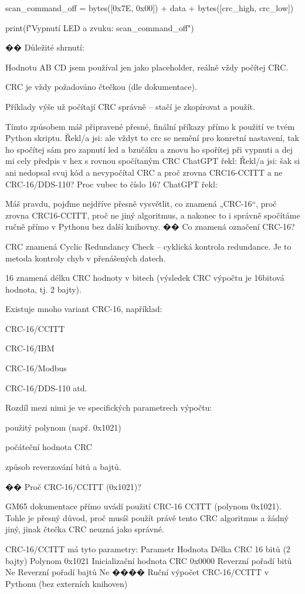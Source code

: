 scan_command_off = bytes([0x7E, 0x00]) + data + bytes([crc_high, crc_low])

print(f"Vypnutí LED a zvuku: {scan_command_off}")

�� Důležité shrnutí:

    Hodnotu AB CD jsem používal jen jako placeholder, reálně vždy počítej CRC.

    CRC je vždy požadováno čtečkou (dle dokumentace).

    Příklady výše už počítají CRC správně – stačí je zkopírovat a použít.

Tímto způsobem máš připravené přesné, finální příkazy přímo k použití ve tvém Python skriptu.
Řekl/a jsi:
ale vždyt to crc se nemění pro konretní nastavení, tak ho spočítej sám pro zapnutí led a bzučáku a znovu ho spořítej při vypnuti a dej mi cely předpis v hex s rovnou spočítaným CRC
ChatGPT řekl:
Řekl/a jsi:
šak si ani nedopsal svuj kód a nevypočítal CRC a proč zrovna CRC16-CCITT a ne CRC-16/DDS-110? Proc vubec to číslo 16?
ChatGPT řekl:

Máš pravdu, pojďme nejdříve přesně vysvětlit, co znamená „CRC-16“, proč zrovna CRC16-CCITT, proč ne jiný algoritmus, a nakonec to i správně spočítáme ručně přímo v Pythonu bez další knihovny.
�� Co znamená označení CRC-16?

    CRC znamená Cyclic Redundancy Check – cyklická kontrola redundance. Je to metoda kontroly chyb v přenášených datech.

    16 znamená délku CRC hodnoty v bitech (výsledek CRC výpočtu je 16bitová hodnota, tj. 2 bajty).

Existuje mnoho variant CRC-16, například:

    CRC-16/CCITT

    CRC-16/IBM

    CRC-16/Modbus

    CRC-16/DDS-110 atd.

Rozdíl mezi nimi je ve specifických parametrech výpočtu:

    použitý polynom (např. 0x1021)

    počáteční hodnota CRC

    způsob reverzování bitů a bajtů.

�� Proč CRC-16/CCITT (0x1021)?

GM65 dokumentace přímo uvádí použití CRC-16 CCITT (polynom 0x1021). Tohle je přesný důvod, proč musíš použít právě tento CRC algoritmus a žádný jiný, jinak čtečka CRC neuzná jako správné.

CRC-16/CCITT má tyto parametry:
Parametr	Hodnota
Délka CRC	16 bitů (2 bajty)
Polynom	0x1021
Inicializační hodnota CRC	0x0000
Reverzní pořadí bitů	Ne
Reverzní pořadí bajtů	Ne
��‍�� Ruční výpočet CRC-16/CCITT v Pythonu (bez externích knihoven)

